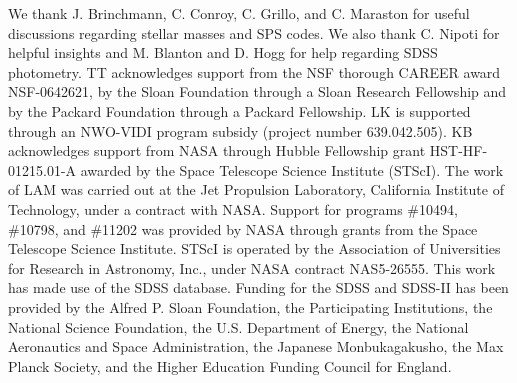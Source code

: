 \documentclass[iop]{emulateapj}
\begin{document}
\acknowledgments 
We thank J. Brinchmann, C. Conroy, C. Grillo, and C. Maraston for useful discussions regarding stellar masses and SPS codes. We also thank C. Nipoti for helpful insights and M. Blanton and D. Hogg for help regarding SDSS photometry. TT acknowledges support from the NSF thorough CAREER award NSF-0642621, by the Sloan Foundation through a Sloan Research Fellowship and by the Packard Foundation through a Packard Fellowship. LK is supported through an NWO-VIDI program subsidy (project number 639.042.505). KB acknowledges support from NASA through Hubble Fellowship grant HST-HF-01215.01-A awarded by the Space Telescope Science Institute (STScI). The work of LAM was carried out at the Jet Propulsion Laboratory, California Institute of Technology, under a contract with NASA. Support for programs \#10494, \#10798, and \#11202 was provided by NASA through grants from the Space Telescope Science Institute. STScI is operated by the Association of Universities for Research in Astronomy, Inc., under NASA contract NAS5-26555. This work has made use of the SDSS database. Funding for the SDSS and SDSS-II has been provided by the Alfred P. Sloan Foundation, the Participating Institutions, the National Science Foundation, the U.S. Department of Energy, the National Aeronautics and Space Administration, the Japanese Monbukagakusho, the Max Planck Society, and the Higher Education Funding Council for England.



\newpage

\begin{thebibliography}{}



\end{thebibliography}

\begin{appendix}

\end{appendix}
\end{document}
